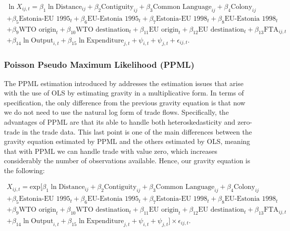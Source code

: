 \documentclass[a4paper,10pt]{article}
\begin{document}
\vspace{-1cm}

	\begin{multline*}
		\ln X_{ij,t}  = \beta_{1} \ln \text{Distance}_{ij} + \beta_{2} \text{Contiguity}_{ij} + \beta_{3} \text{Common Language}_{ij} + \beta_{4} \text{Colony}_{ij} \\
		+ \beta_{5} \text{Estonia-EU 1995}_{t} + \beta_{6} \text{EU-Estonia 1995}_{t} + \beta_{7} \text{Estonia-EU 1998}_{t} + \beta_{8} \text{EU-Estonia 1998}_{t} \\
		+ \beta_{9} \text{WTO origin}_{t} + \beta_{10} \text{WTO destination}_{t} + \beta_{11} \text{EU origin}_{t} + \beta_{12} \text{EU destination}_{t} + \beta_{13} \text{FTA}_{ij,t} \\
		+ \beta_{14} \ln \text{Output}_{i,t} + \beta_{15} \ln \text{Expenditure}_{j,t} + \psi_{i,t} + \psi_{j,t} + \epsilon_{ij,t}.
	\end{multline*}

\subsubsection{Poisson Pseudo Maximum Likelihood (PPML)} \label{traditional_ppml}

The PPML estimation introduced by \cite{silva_log_2006} addresses the estimation issues that arise with the use of OLS by estimating gravity in a multiplicative form. In terms of specification, the only difference from the previous gravity equation is that now we do not need to use the natural log form of trade flows. Specifically, the advantages of PPML are that its able to handle both heteroskedasticity and zero-trade in the trade data. This last point is one of the main differences between the gravity equation estimated by PPML and the others estimated by OLS, meaning that with PPML we can handle trade with value zero, which increases considerably the number of observations available. Hence, our gravity equation is the following:

\vspace{-1cm}

	\begin{multline*}
		X_{ij,t}  = \text{exp} [\beta_{1} \ln \text{Distance}_{ij} + \beta_{2} \text{Contiguity}_{ij} + \beta_{3} \text{Common Language}_{ij} + \beta_{4} \text{Colony}_{ij} \\
		+ \beta_{5} \text{Estonia-EU 1995}_{t} + \beta_{6} \text{EU-Estonia 1995}_{t} + \beta_{7} \text{Estonia-EU 1998}_{t} + \beta_{8} \text{EU-Estonia 1998}_{t} \\
		+ \beta_{9} \text{WTO origin}_{t} + \beta_{10} \text{WTO destination}_{t} + \beta_{11} \text{EU origin}_{t} + \beta_{12} \text{EU destination}_{t} + \beta_{13} \text{FTA}_{ij,t} \\
		+ \beta_{14} \ln \text{Output}_{i,t} + \beta_{15} \ln \text{Expenditure}_{j,t} + \psi_{i,t} + \psi_{j,t}]  \times \epsilon_{ij,t}.
	\end{multline*}
\end{document}

